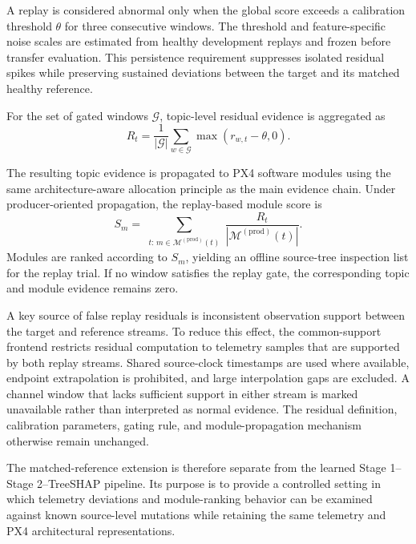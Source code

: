 A replay is considered abnormal only when the global score exceeds a calibration threshold $\theta$ for three consecutive windows. The threshold and feature-specific noise scales are estimated from healthy development replays and frozen before transfer evaluation. This persistence requirement suppresses isolated residual spikes while preserving sustained deviations between the target and its matched healthy reference.

For the set of gated windows $\mathcal{G}$, topic-level residual evidence is aggregated as
\begin{equation}
R_t
=
\frac{1}{|\mathcal{G}|}
\sum_{w\in\mathcal{G}}
\max\left(r_{w,t}-\theta,0\right).
\label{eq:replay_topic_evidence}
\end{equation}

The resulting topic evidence is propagated to PX4 software modules using the same architecture-aware allocation principle as the main evidence chain. Under producer-oriented propagation, the replay-based module score is
\begin{equation}
S_m
=
\sum_{\substack{t:\,m\in\mathcal{M}^{(\mathrm{prod})}(t)}}
\frac{R_t}{|\mathcal{M}^{(\mathrm{prod})}(t)|}.
\label{eq:paired_module}
\end{equation}
Modules are ranked according to $S_m$, yielding an offline source-tree inspection list for the replay trial. If no window satisfies the replay gate, the corresponding topic and module evidence remains zero.

A key source of false replay residuals is inconsistent observation support between the target and reference streams. To reduce this effect, the common-support frontend restricts residual computation to telemetry samples that are supported by both replay streams. Shared source-clock timestamps are used where available, endpoint extrapolation is prohibited, and large interpolation gaps are excluded. A channel window that lacks sufficient support in either stream is marked unavailable rather than interpreted as normal evidence. The residual definition, calibration parameters, gating rule, and module-propagation mechanism otherwise remain unchanged.

The matched-reference extension is therefore separate from the learned Stage 1--Stage 2--TreeSHAP pipeline. Its purpose is to provide a controlled setting in which telemetry deviations and module-ranking behavior can be examined against known source-level mutations while retaining the same telemetry and PX4 architectural representations.
